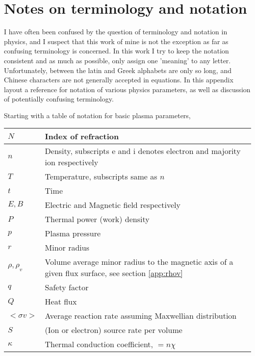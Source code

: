 \chapter{Notes on terminology and notation}\label{app:term}
\begin{refsection}


I have often been confused by the question of terminology and notation in physics, and I suspect that this work of mine is not the exception as far as confusing terminology is concerned. In this work I try to keep the notation consistent and as much as possible, only assign one 'meaning' to any letter. Unfortunately, between the latin and Greek alphabets are only so long, and Chinese characters are not generally accepted in equations. In this appendix layout a reference for notation of various physics parameters, as well as discussion of potentially confusing terminology.

Starting with a table of notation for basic plasma parameters,
\begin{center}\begin{tabular}{p{1in}|p{3.5in}}
     $N$ &  Index of refraction\\ \hline
     $n$ & Density, subscripts e and i denotes electron and majority ion respectively\\ \hline
     $T$ & Temperature, subscripts same as $n$\\ \hline
     $t$ & Time\\ \hline
     $E, B$ & Electric and Magnetic field respectively\\ \hline
     $P$ & Thermal power (work) density\\ \hline
     $p$ & Plasma pressure\\ \hline
     $r$ & Minor radius \\ \hline
     $\rho, \rho_v$ & Volume average minor radius to the magnetic axis of a given flux surface, see section \ref{app:rhov}\\ \hline
     $q$ & Safety factor \\ \hline
     $Q$ & Heat flux \\ \hline
     $<\sigma v>$ & Average reaction rate assuming Maxwellian distribution\\ \hline
     $S$ & (Ion or electron) source rate per volume\\ \hline
     $\kappa$ & Thermal conduction coefficient, $=n\chi$\\
\end{tabular}\end{center}




\end{refsection}
